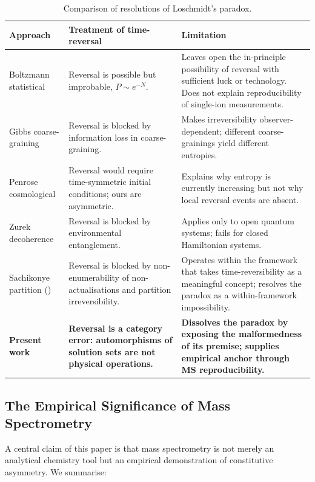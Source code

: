 \documentclass[twocolumn,10pt,a4paper]{article}
\theoremstyle{definition}
\theoremstyle{remark}
\begin{document}
\begin{table}[t]
\centering
\small
\caption{Comparison of resolutions of Loschmidt's paradox.}
\label{tab:comparison}
\begin{tabular}{p{}p{}p{}}
\toprule
\textbf{Approach} & \textbf{Treatment of time-reversal} & \textbf{Limitation} \\
\midrule
Boltzmann statistical \citep{boltzmann1877} & Reversal is possible but improbable, $P \sim e^{-N}$. & Leaves open the in-principle possibility of reversal with sufficient luck or technology. Does not explain reproducibility of single-ion measurements. \\
\addlinespace
Gibbs coarse-graining \citep{gibbs1902} & Reversal is blocked by information loss in coarse-graining. & Makes irreversibility observer-dependent; different coarse-grainings yield different entropies. \\
\addlinespace
Penrose cosmological \citep{penrose1989} & Reversal would require time-symmetric initial conditions; ours are asymmetric. & Explains why entropy is currently increasing but not why local reversal events are absent. \\
\addlinespace
Zurek decoherence \citep{zurek2003} & Reversal is blocked by environmental entanglement. & Applies only to open quantum systems; fails for closed Hamiltonian systems. \\
\addlinespace
Sachikonye partition (\citeyear{sachikonye2025loschmidt}) & Reversal is blocked by non-enumerability of non-actualisations and partition irreversibility. & Operates within the framework that takes time-reversibility as a meaningful concept; resolves the paradox as a within-framework impossibility. \\
\addlinespace
\textbf{Present work} & \textbf{Reversal is a category error: automorphisms of solution sets are not physical operations.} & \textbf{Dissolves the paradox by exposing the malformedness of its premise; supplies empirical anchor through MS reproducibility.} \\
\bottomrule
\end{tabular}
\end{table}

\subsection{The Empirical Significance of Mass Spectrometry}

A central claim of this paper is that mass spectrometry is not merely an analytical chemistry tool but an empirical demonstration of constitutive asymmetry. We summarise:
\end{document}
